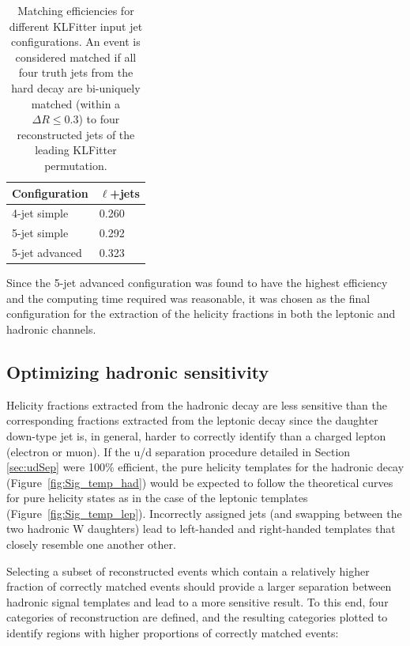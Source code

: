 \begin{table}[]
\centering
\begin{tabular}{l|l}
\hline \hline
Configuration  & $\ell$+jets \\ \hline
4-jet simple     &  0.260   \\
5-jet simple     &  0.292   \\
5-jet advanced   &  0.323   \\ \hline \hline
\end{tabular}
\caption{Matching efficiencies for different KLFitter input jet configurations. An event is considered matched if all four truth jets from the hard \ttbar decay are bi-uniquely matched (within a $\Delta R\leq 0.3$) to four reconstructed jets of the leading KLFitter permutation.}
\label{tab:matchEff}
\end{table}

Since the 5-jet advanced configuration was found to have the highest efficiency and the computing time required was reasonable, it was chosen as the final configuration for the extraction of the helicity fractions in both the leptonic and hadronic channels.

\subsection{Optimizing hadronic sensitivity}
\label{sec:hadronicOptimization}
Helicity fractions extracted from the hadronic \w decay are less sensitive than the corresponding fractions extracted from the leptonic \w decay since the daughter down-type jet is, in general, harder to correctly identify than a charged lepton (electron or muon). If the u/d separation procedure detailed in Section \ref{sec:udSep} were 100\% efficient, the pure helicity templates for the hadronic decay (Figure~\ref{fig:Sig_temp_had}) would be expected to follow the theoretical curves for pure helicity states as in the case of the leptonic templates (Figure~\ref{fig:Sig_temp_lep}). Incorrectly assigned jets (and swapping between the two hadronic W daughters) lead to left-handed and right-handed templates that closely resemble one another other. 

Selecting a subset of reconstructed events which contain a relatively higher fraction of correctly matched events should provide a larger separation between hadronic signal templates and lead to a more sensitive result. To this end, four categories of \ttbar reconstruction are defined, and the resulting categories plotted to identify regions with higher proportions of correctly matched events:

